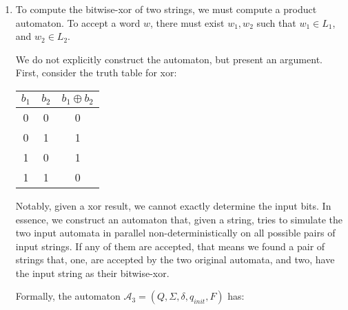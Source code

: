 \begin{exercise}{}
\begin{solution}
\begin{enumerate}
\begin{center}
      \end{center}

      \item To compute the bitwise-xor of two strings, we must compute a product
      automaton. To accept a word \(w\), there must exist \(w_1, w_2\) such that
      \(w_1 \in L_1\), and \(w_2 \in L_2\).

      We do not explicitly construct the automaton, but present an argument.
      First, consider the truth table for xor:

      \begin{center}
        \begin{tabular}{c c | c}
          \(b_1\) & \(b_2\) & \(b_1 \oplus b_2\) \\
          \hline
          0 & 0 & 0 \\
          0 & 1 & 1 \\
          1 & 0 & 1 \\
          1 & 1 & 0 \\
        \end{tabular}
      \end{center}

      Notably, given a xor result, we cannot exactly determine the input bits.
      In essence, we construct an automaton that, given a string, tries to
      simulate the two input automata in parallel non-deterministically on all
      possible pairs of input strings. If any of them are accepted, that means
      we found a pair of strings that, one, are accepted by the two original
      automata, and two, have the input string as their bitwise-xor.
      
      Formally, the automaton \(\mathcal{A}_3 = (Q, \Sigma, \delta, q_{init},
      F)\) has:


\end{enumerate}
\end{solution}
\end{exercise}
